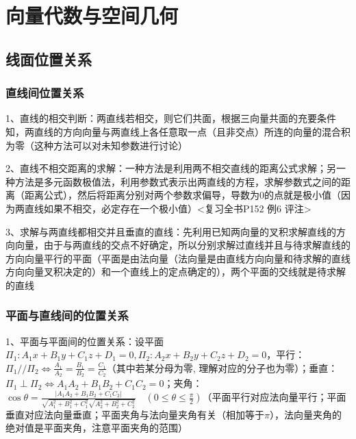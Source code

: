 \chapter{向量代数与空间几何}

\section{线面位置关系}



\subsection{直线间位置关系}

1、直线的相交判断：两直线若相交，则它们共面，根据三向量共面的充要条件知，两直线的方向向量与两直线上各任意取一点（且非交点）所连的向量的混合积为零（这种方法可以对未知参数进行讨论）

2、直线不相交距离的求解：一种方法是利用两不相交直线的距离公式求解；另一种方法是多元函数极值法，利用参数式表示出两直线的方程，求解参数式之间的距离（距离公式），然后将距离分别对两个参数求偏导，导数为0的点就是极小值（因为两直线如果不相交，必定存在一个极小值）<复习全书P152 例6 评注>

3、求解与两直线都相交并且垂直的直线：先利用已知两向量的叉积求解直线的方向向量，由于与两直线的交点不好确定，所以分别求解过直线并且与待求解直线的方向向量平行的平面（平面是由法向量（法向量是由直线方向向量和待求解的直线方向向量叉积决定的）和一个直线上的定点确定的），两个平面的交线就是待求解的直线



\subsection{平面与直线间的位置关系}

1、平面与平面间的位置关系：设平面$\Pi_{1}: A_{1} x+B_{1} y+C_{1} z+D_{1}=0, \Pi_{2}: A_{2} x+B_{2} y+C_{2} z+D_{2}=0$，平行：$\Pi_{1} / / \Pi_{2} \Leftrightarrow \frac{A_{1}}{A_{2}}=\frac{B_{1}}{B_{2}}=\frac{C_{1}}{C_{2}}$（其中若某分母为零, 理解对应的分子也为零）；垂直：$\Pi_{1} \perp \Pi_{2} \Leftrightarrow A_{1} A_{2}+B_{1} B_{2}+C_{1} C_{2}=0$；夹角：$\cos \theta=\frac{\left|A_{1} A_{2}+B_{1} B_{2}+C_{1} C_{2}\right|}{\sqrt{A_{1}^{2}+B_{1}^{2}+C_{1}^{2}} \sqrt{A_{2}^{2}+B_{2}^{2}+C_{2}^{2}}} \quad\left(0 \leqslant \theta \leqslant \frac{\pi}{2}\right)$（平面平行对应法向量平行；平面垂直对应法向量垂直；平面夹角与法向量夹角有关（相加等于$\pi$），法向量夹角的绝对值是平面夹角，注意平面夹角的范围）

